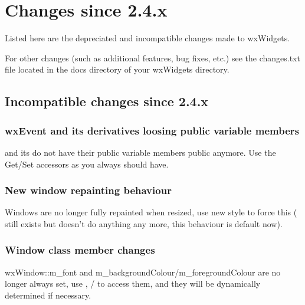 \section{Changes since 2.4.x}\label{changes}

Listed here are the depreciated and incompatible changes made to wxWidgets.

For other changes (such as additional features, bug fixes, etc.) see the changes.txt file located in the docs directory of your wxWidgets directory.



\subsection{Incompatible changes since 2.4.x}\label{incompatiblesince24}

\subsubsection{wxEvent and its derivatives loosing public variable members}\label{wxeventpublictoprotected}

 and its  do not have their public variable members public anymore.
Use the Get/Set accessors as you always should have.



\subsubsection{New window repainting behaviour}\label{newwindowrepainting}

Windows are no longer fully repainted when resized, use new style  to force this ( still exists but doesn't do anything any more, this behaviour is default now).



\subsubsection{Window class member changes}\label{windowclassmemberchanges}

wxWindow::m\_font and m\_backgroundColour/m\_foregroundColour are no longer always set, use , / to access them, and they will be dynamically determined if necessary.



